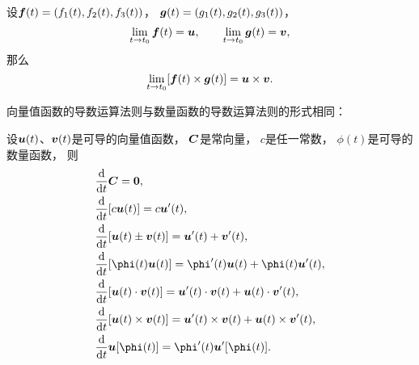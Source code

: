 \begin{theorem}
设\(\boldsymbol{f}(t) = (f_1(t),f_2(t),f_3(t))\)，
\(\boldsymbol{g}(t) = (g_1(t),g_2(t),g_3(t))\)，
\[
	\lim_{t \to t_0} \boldsymbol{f}(t) = \boldsymbol{u},
	\qquad
	\lim_{t \to t_0} \boldsymbol{g}(t) = \boldsymbol{v},
\]
那么\[
	\lim_{t \to t_0} [\boldsymbol{f}(t) \times \boldsymbol{g}(t)]
	= \boldsymbol{u} \times \boldsymbol{v}.
\]
\end{theorem}

向量值函数的导数运算法则与数量函数的导数运算法则的形式相同：
\begin{theorem}[向量值函数的导数运算法则]
设\(\boldsymbol{u}(t)\)、\(\boldsymbol{v}(t)\)是可导的向量值函数，
\(\boldsymbol{C}\)是常向量，
\(c\)是任一常数，
\(\phi(t)\)是可导的数量函数，
则\begin{align}
	&\dv{t} \vb{C}
		= \vb{0}, \\
	&\dv{t} [c \vb{u}(t)]
		= c \vb{u}'(t), \\
	&\dv{t} [\vb{u}(t) \pm \vb{v}(t)]
		= \vb{u}'(t) + \vb{v}'(t), \\
	&\dv{t} [\phi(t) \vb{u}(t)]
		= \phi'(t) \vb{u}(t) + \phi(t) \vb{u}'(t), \\
	&\dv{t} [\vb{u}(t) \cdot \vb{v}(t)]
		= \vb{u}'(t) \cdot \vb{v}(t) + \vb{u}(t) \cdot \vb{v}'(t), \\
	&\dv{t} [\vb{u}(t) \times \vb{v}(t)]
		= \vb{u}'(t) \times \vb{v}(t) + \vb{u}(t) \times \vb{v}'(t), \\
	&\dv{t} \vb{u}[\phi(t)]
		= \phi'(t) \vb{u}'[\phi(t)].
\end{align}
\end{theorem}
